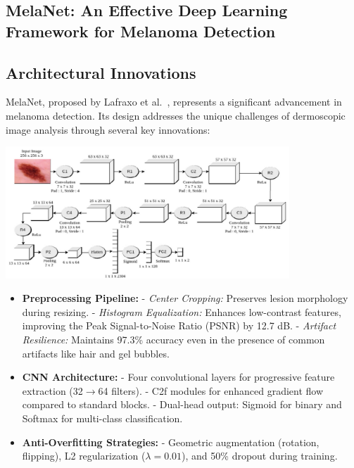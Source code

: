 \documentclass[a4paper,12pt]{report}
\begin{document}
\begin{spacing}{1.5}
    
    \section{MelaNet: An Effective Deep Learning Framework for Melanoma Detection}
    
    \subsection*{Architectural Innovations}
    
    MelaNet, proposed by Lafraxo et al.~\cite{lafraxo2022melanet}, represents a significant advancement in melanoma detection. Its design addresses the unique challenges of dermoscopic image analysis through several key innovations:
    
    \begin{center}
        \includegraphics[width=0.8\textwidth]{Pics/melanetCNNarchi.png}
    \end{center}

    \begin{itemize}
        \item \textbf{Preprocessing Pipeline:}  
        - \textit{Center Cropping:} Preserves lesion morphology during resizing.  
        - \textit{Histogram Equalization:} Enhances low-contrast features, improving the Peak Signal-to-Noise Ratio (PSNR) by 12.7 dB.  
        - \textit{Artifact Resilience:} Maintains 97.3\% accuracy even in the presence of common artifacts like hair and gel bubbles.
        \item \textbf{CNN Architecture:}  
        - Four convolutional layers for progressive feature extraction (32$\rightarrow$64 filters).  
        - C2f modules for enhanced gradient flow compared to standard blocks.  
        - Dual-head output: Sigmoid for binary and Softmax for multi-class classification.
        \item \textbf{Anti-Overfitting Strategies:}  
        - Geometric augmentation (rotation, flipping), L2 regularization ($\lambda=0.01$), and 50\% dropout during training.
    \end{itemize}
    

\end{spacing}
\end{document}
